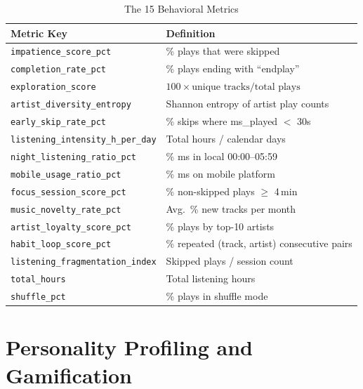 \documentclass[conference]{IEEEtran}
\begin{document}
\begin{table}[!t]
\caption{The 15 Behavioral Metrics}
\label{tab:metrics}
\centering
\scriptsize
\setlength{\tabcolsep}{2.5pt}
\renewcommand{\arraystretch}{1.12}
\begin{tabularx}{\columnwidth}{@{}p{4.32cm}Y@{}}
\toprule
\textbf{Metric Key} & \textbf{Definition} \\
\midrule
\texttt{impatience\_score\_pct}          & \% plays that were skipped \\
\texttt{completion\_rate\_pct}           & \% plays ending with ``endplay'' \\
\texttt{exploration\_score}              & $100 \times \text{unique tracks} / \text{total plays}$ \\
\texttt{artist\_diversity\_entropy}      & Shannon entropy of artist play counts \\
\texttt{early\_skip\_rate\_pct}          & \% skips where ms\_played $<$ 30s \\
\texttt{listening\_intensity\_h\_per\_day} & Total hours / calendar days \\
\texttt{night\_listening\_ratio\_pct}    & \% ms in local 00:00–05:59 \\
\texttt{mobile\_usage\_ratio\_pct}       & \% ms on mobile platform \\
\texttt{focus\_session\_score\_pct}      & \% non-skipped plays $\geq$ 4\,min \\
\texttt{music\_novelty\_rate\_pct}       & Avg.\ \% new tracks per month \\
\texttt{artist\_loyalty\_score\_pct}     & \% plays by top-10 artists \\
\texttt{habit\_loop\_score\_pct}         & \% repeated (track, artist) consecutive pairs \\
\texttt{listening\_fragmentation\_index} & Skipped plays / session count \\
\texttt{total\_hours}                    & Total listening hours \\
\texttt{shuffle\_pct}                    & \% plays in shuffle mode \\
\bottomrule
\end{tabularx}
\end{table}

\section{Personality Profiling and Gamification}
\end{document}
